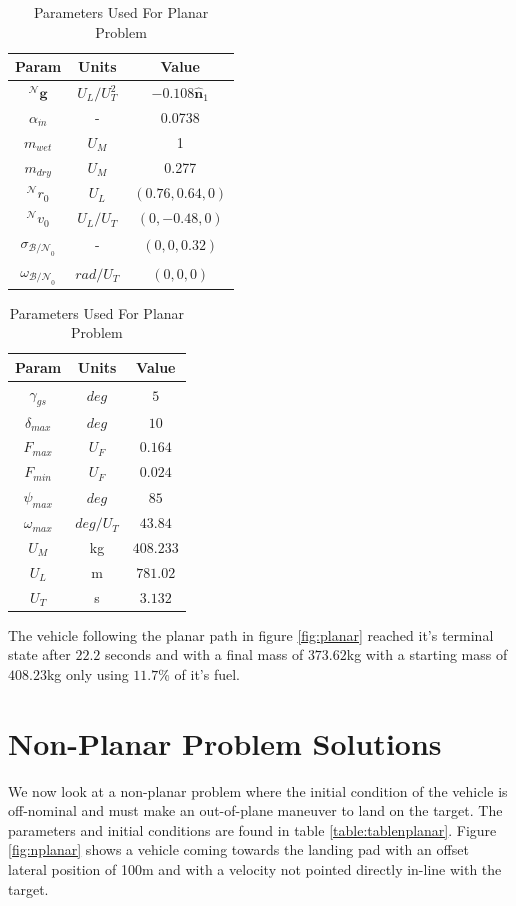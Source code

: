 \begin{table}[ht]
\caption{Parameters Used For Planar Problem}
\centering 
\begin{tabular}{c c c} 
\hline\hline
Param & Units & Value \\ [0.5ex] 
\hline 
$^\mathcal{N}\mathbf{g}$ 		& $U_L/U_T^2$ 	& $-0.108\hat{\mathbf{n}}_1$  \\ 
$\alpha_{\dot{m}}$ 				& - 			& 0.0738  \\
$m_{wet}$ 						& $U_M$ 		& 1  \\
$m_{dry}$ 						& $U_M$ 		& 0.277  \\
$^\mathcal{N}r_{0}$ 			& $U_L$ 		& $(0.76,0.64,0)$  \\
$^\mathcal{N}v_{0}$ 			& $U_L/U_T$	 	& $(0,-0.48,0)$  \\
$\sigma_{\mathcal{B/N}_0}$ 		& - 		& $(0,0,0.32)$  \\
$\omega_{\mathcal{B/N}_0}$ 		& $rad/U_T$ 	& $(0,0,0)$ \\[1ex] 
\hline
\end{tabular}
\begin{tabular}{c c c} 
\hline\hline
Param & Units & Value \\ [0.5ex] 
\hline 
$\gamma_{gs}$ 					& $deg$ 		& $5$  \\ 
$\delta_{max}$	 				& $deg$ 		& $10$  \\
$F_{max}$ 						& $U_F$ 		& $0.164$ \\
$F_{min}$ 						& $U_F$ 		& $0.024$  \\
$\psi_{max}$ 					& $deg$ 		& $85$  \\
$\omega_{max}$ 					& $deg/U_T$	 	& $43.84$  \\
$U_M$ 							& kg 			& $408.233$  \\
$U_L$					 		& m			 	& $781.02$ \\
$U_T$					 		& s			 	& $3.132$ \\[1ex] 
\hline
\end{tabular}
\label{table:tableplanar}
\end{table}

The vehicle following the planar path in figure \ref{fig:planar} reached it's terminal state after $22.2$ seconds and with a final mass of $373.62$kg with a starting mass of $408.23$kg only using $11.7$\% of it's fuel.


\section{Non-Planar Problem Solutions}
We now look at a non-planar problem where the initial condition of the vehicle is off-nominal and must make an out-of-plane maneuver to land on the target. The parameters and initial conditions are found in table \ref{table:tablenplanar}. Figure \ref{fig:nplanar} shows a vehicle coming towards the landing pad with an offset lateral position of 100m and with a velocity not pointed directly in-line with the target. 

